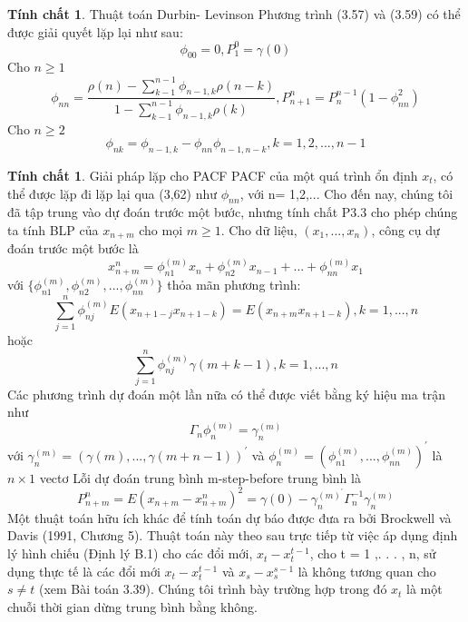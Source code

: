 \documentclass[12pt, a4paper,oneside]{book}
\theoremstyle{definition}
\newtheorem{tc}[theo]{Tính chất}
\begin{document}
\begin{tc}
	Thuật toán  Durbin- Levinson
	Phương trình (3.57) và (3.59) có thể được giải quyết lặp lại như sau: $$\phi_{00}= 0 , P_{1}^{0}= \gamma(0)$$
	Cho $n\geq 1$ 
	$$\phi_{nn} = \dfrac{\rho(n) - \sum_{k-1}^{n-1}\phi_{n-1,k}\rho
		(n-k)}{1- \sum_{k-1}^{n-1}\phi_{n-1,k}\rho(k)}, P_{n+1}^{n}= P_{n}^{n-1}(1 - \phi_{nn}^{2})$$
	Cho $n\geq 2$
	$$\phi_{nk} = \phi_{n-1,k}- \phi_{nn}\phi_{n-1,n-k},  k=1,2,...,n-1$$
\end{tc}
\begin{tc}
	Giải pháp lặp cho PACF
	PACF của một quá trình ổn định $x_{t}$, có thể được lặp đi lặp lại qua (3,62) như $\phi_{nn}$, với n= 1,2,...
	Cho đến nay, chúng tôi đã tập trung vào dự đoán trước một bước, nhưng tính chất P3.3 cho phép chúng ta tính BLP của $x_{n+m}$ cho mọi $m \geq 1$. Cho dữ liệu, $(x_{1} ,. . . , x_{n})$, công cụ dự đoán trước một bước là
	$$x_{n+m}^{n}= \phi_{n1}^{(m)}x_{n} +\phi_{n2}^{(m)}x_{n-1}+...+\phi_{nn}^{(m)}x_{1}$$
	với $\{\phi_{n1}^{(m)}, \phi_{n2}^{(m)},...,\phi_{nn}^{(m)}\}$ thỏa mãn phương trình:
	$$ \sum_{j=1}^{n}\phi_{nj}^{(m)}E(x_{n+1-j}x_{n+1-k})= E (x_{n+m}x_{n+1-k}), k= 1,...,n$$
	hoặc 
	$$\sum_{j=1}^{n}\phi_{nj}^{(m)}\gamma(m+k-1), k=1,...,n$$ 
	Các phương trình dự đoán một lần nữa có thể được viết bằng ký hiệu ma trận như
	$$\Gamma_{n}\phi_{n}^{(m)}= \gamma_{n}^{(m)}$$
	với $\gamma_{n}^{(m)}= (\gamma(m),...,\gamma(m+n-1))^{'}$
	và $\phi_{n}^{(m)} = (\phi_{n1}^{(m)},...,\phi_{nn}^{(m)})^{'}$ là $n\times 1$ vectơ
	Lỗi dự đoán trung bình m-step-before trung bình là
	$$P_{n+m}^{n} = E (x_{n+m}- x_{n+m}^{n})^{2} = \gamma(0) - \gamma_{n}^{(m)^{'}}\Gamma_{n}^{-1}\gamma_{n}^{(m)}$$
	Một thuật toán hữu ích khác để tính toán dự báo được đưa ra bởi Brockwell và Davis (1991, Chương 5). Thuật toán này theo sau trực tiếp từ việc áp dụng định lý hình chiếu (Định lý B.1) cho các đổi mới, $x_{t} - x_{t}^{t-1}$, cho t = 1 ,. . . , n, sử dụng thực tế là các đổi mới $x_{t} - x_{t}^{t-1}$ và $x_{s} - x_{s}^{s-1}$ là không tương quan cho $s \neq t$ (xem Bài toán 3.39). Chúng tôi trình bày trường hợp trong đó $x_{t}$ là một chuỗi thời gian dừng trung bình bằng không.
	
\end{tc}
\end{document}
